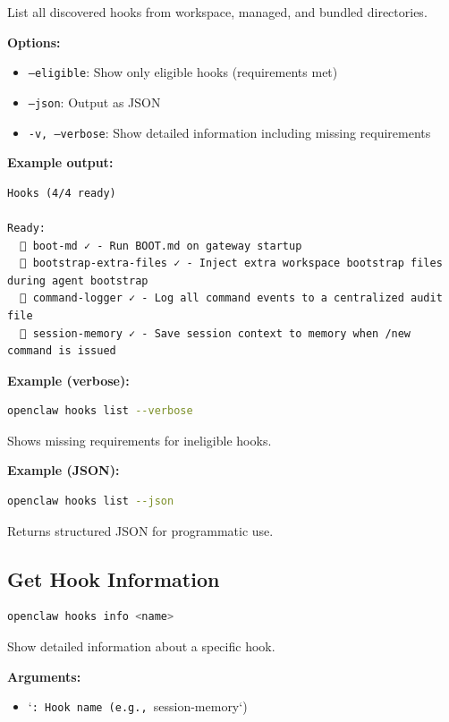 List all discovered hooks from workspace, managed, and bundled directories.

\textbf{Options:}

\begin{itemize}
  \item \texttt{--eligible}: Show only eligible hooks (requirements met)
  \item \texttt{--json}: Output as JSON
  \item \texttt{-v, --verbose}: Show detailed information including missing requirements
\end{itemize}


\textbf{Example output:}

\begin{lstlisting}
Hooks (4/4 ready)

Ready:
  🚀 boot-md ✓ - Run BOOT.md on gateway startup
  📎 bootstrap-extra-files ✓ - Inject extra workspace bootstrap files during agent bootstrap
  📝 command-logger ✓ - Log all command events to a centralized audit file
  💾 session-memory ✓ - Save session context to memory when /new command is issued
\end{lstlisting}


\textbf{Example (verbose):}

\begin{lstlisting}[language=bash]
openclaw hooks list --verbose
\end{lstlisting}


Shows missing requirements for ineligible hooks.

\textbf{Example (JSON):}

\begin{lstlisting}[language=bash]
openclaw hooks list --json
\end{lstlisting}


Returns structured JSON for programmatic use.

\subsection{Get Hook Information}


\begin{lstlisting}[language=bash]
openclaw hooks info <name>
\end{lstlisting}


Show detailed information about a specific hook.

\textbf{Arguments:}

\begin{itemize}
  \item `\texttt{: Hook name (e.g., }session-memory`)
\end{itemize}


